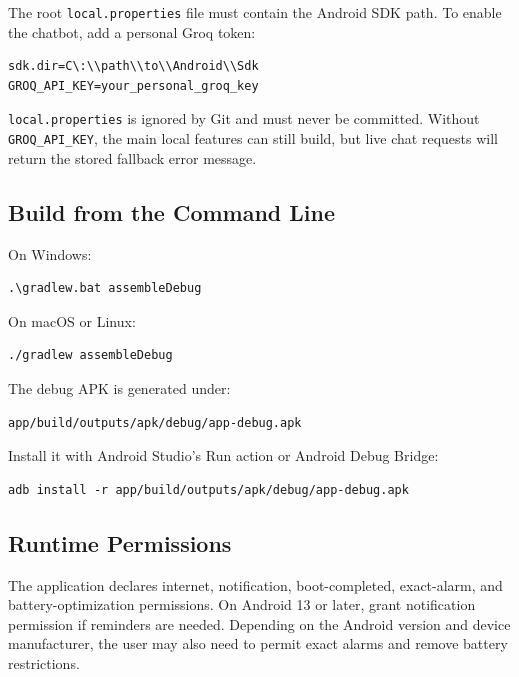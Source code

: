 The root \texttt{local.properties} file must contain the Android SDK path. To enable the chatbot, add a personal Groq token:

\begin{lstlisting}
sdk.dir=C\:\\path\\to\\Android\\Sdk
GROQ_API_KEY=your_personal_groq_key
\end{lstlisting}

\texttt{local.properties} is ignored by Git and must never be committed. Without \texttt{GROQ\_API\_KEY}, the main local features can still build, but live chat requests will return the stored fallback error message.

\subsection{Build from the Command Line}

On Windows:

\begin{lstlisting}
.\gradlew.bat assembleDebug
\end{lstlisting}

On macOS or Linux:

\begin{lstlisting}
./gradlew assembleDebug
\end{lstlisting}

The debug APK is generated under:

\begin{lstlisting}
app/build/outputs/apk/debug/app-debug.apk
\end{lstlisting}

Install it with Android Studio's Run action or Android Debug Bridge:

\begin{lstlisting}
adb install -r app/build/outputs/apk/debug/app-debug.apk
\end{lstlisting}

\subsection{Runtime Permissions}

The application declares internet, notification, boot-completed, exact-alarm, and battery-optimization permissions. On Android 13 or later, grant notification permission if reminders are needed. Depending on the Android version and device manufacturer, the user may also need to permit exact alarms and remove battery restrictions.

